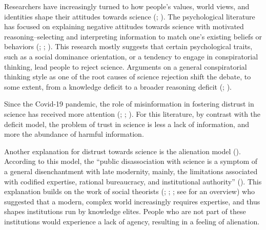 \documentclass[
  jou,
  floatsintext,
  longtable,
  nolmodern,
  notxfonts,
  notimes,
  colorlinks=true,linkcolor=blue,citecolor=blue,urlcolor=blue]{apa7}
\begin{document}
Researchers have increasingly turned to how people's values, world
views, and identities shape their attitudes towards science
(;
). The psychological literature has focused on
explaining negative attitudes towards science with motivated
reasoning--selecting and interpreting information to match one's
existing beliefs or behaviors
(;
;
). This research mostly suggests that certain
psychological traits, such as a social dominance orientation, or a
tendency to engage in conspiratorial thinking, lead people to reject
science. Arguments on a general conspiratorial thinking style as one of
the root causes of science rejection shift the debate, to some extent,
from a knowledge deficit to a broader reasoning deficit
(;
).

Since the Covid-19 pandemic, the role of misinformation in fostering
distrust in science has received more attention
(;
;
). For this literature, by contrast with the deficit model,
the problem of trust in science is less a lack of information, and more
the abundance of harmful information.

Another explanation for distrust towards science is the alienation model
().
According to this model, the ``public disassociation with science is a
symptom of a general disenchantment with late modernity, mainly, the
limitations associated with codified expertise, rational bureaucracy,
and institutional authority''
(). This explanation builds on the work of social theorists
(;
;
; see
 for an
overview) who suggested that a modern, complex world increasingly
requires expertise, and thus shapes institutions run by knowledge
elites. People who are not part of these institutions would experience a
lack of agency, resulting in a feeling of alienation.
\end{document}

